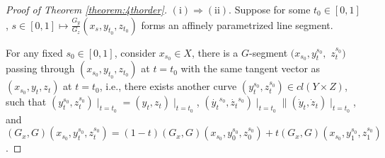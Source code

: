 \begin{proof}[Proof of Theorem \ref{theorem:4thorder}]
	$\mathrm{(i)}\Rightarrow \mathrm{(ii)}.$ Suppose for some $t_0 \in [0,1]$, $s \in [0,1] \longmapsto \frac{G_y}{G_z}(x_s, y_{t_0}, z_{t_0})$ forms an affinely parametrized line segment.
	
	For any fixed $s_0\in [0,1]$, consider $x_{s_0}\in X$, there is a $G$-segment $(x_{s_0}, y_t^{s_0},$ $ z_t^{s_0})$ passing through $(x_{s_0}, y_{t_0}, z_{t_0})$ at $t=t_0$ with the same tangent vector as $(x_{s_0}, y_t, z_t)$ at $t=t_0$, i.e., there exists
	another curve $(y_t^{s_0}, z_t^{s_0}) \in cl( Y \times Z)$, such that $(y_t^{s_0},z_t^{s_0})\mid _{t=t_0} = (y_t,z_t)\mid _{t=t_0}$,  $(\dot{y_t}^{s_0},\dot{z_t}^{s_0})\mid _{t=t_0} \parallel (\dot{y}_t,\dot{z}_t)\mid _{t=t_0}$, and $(G_x, G)(x_{s_0},y_t^{s_0},z_t^{s_0}) = (1-t)(G_x, G)(x_{s_0},y_0^{s_0},z_0^{s_0})+t (G_x, G)(x_{s_0},y_1^{s_0},z_1^{s_0})$. 
	

\end{proof}
